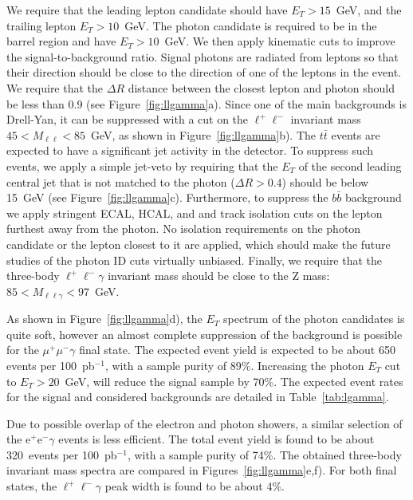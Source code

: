 \documentclass{cmspaper}
\begin{document}
We require that the leading lepton candidate should have $E_T > 15$~GeV, and the trailing lepton  $E_T > 10$~GeV.
The photon candidate is required to be in the barrel region and have  $E_T > 10$~GeV.
We then apply kinematic cuts to improve the signal-to-background ratio. 
Signal photons are radiated from leptons so that their direction should be close to the direction of 
one of the leptons in the event. We require that the $\Delta R$ distance between the closest lepton and photon
should be less than 0.9 (see Figure~\ref{fig:llgamma}a). 
Since one of the main backgrounds is Drell-Yan, it can be suppressed with a cut on the $\ell^+\ell^-$ invariant mass 
$45 < M_{\ell\ell} < 85$~GeV, as shown in Figure~\ref{fig:llgamma}b). The  $t\bar{t}$ events are expected to have
a significant jet activity in the detector. To suppress such events, we apply a simple jet-veto by
requiring that the $E_T$ of the second leading central jet that is not matched to the photon 
 ($\Delta R > 0.4$) should be below 15~GeV 
(see Figure~\ref{fig:llgamma}c). Furthermore, to suppress the $b\bar{b}$ background we apply stringent
ECAL, HCAL, and and track isolation cuts on the lepton furthest away from the photon. No 
isolation requirements on the
photon candidate or the lepton closest to it are applied, which should make the future studies of the photon ID cuts
virtually unbiased. Finally, we require that the three-body $\ell^+\ell^-\gamma$ invariant mass should
be close to the Z mass: $ 85 < M_{\ell\ell\gamma} < 97$~GeV.

As shown in Figure~\ref{fig:llgamma}d), the $E_T$  spectrum of the photon candidates is quite soft, however
an almost complete suppression of the background is possible for the  $\mu^+\mu^-\gamma$ final state.
The expected event yield is expected to be about 650 events per 100~pb$^{-1}$, with a sample purity of 89\%.
Increasing the photon $E_T$ cut to $E_T > 20$~GeV, will reduce the signal sample by 70\%. The expected
event rates for the signal and considered backgrounds are detailed in Table~\ref{tab:lgamma}.

Due to possible overlap of the electron and photon showers, a similar  selection of 
the $\mathrm{e}^+\mathrm{e}^-\gamma$
events is less efficient. The total event yield is found to be about 320~events per 100~pb$^{-1}$, 
with a sample purity of 74\%. The obtained three-body invariant mass spectra are compared 
in Figures~\ref{fig:llgamma}e,f). For both final states, the  $\ell^+\ell^-\gamma$ peak width 
is found to be about 4\%.
\end{document}
